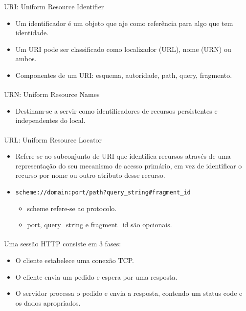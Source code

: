 \documentclass[../resumosLTW.tex]{subfiles}
\begin{document}
 

URI: Uniform Resource Identifier
\begin{itemize}
    \item Um identificador é um objeto que aje como referência para algo que tem identidade.
    \item Um URI pode ser classificado como localizador (URL), nome (URN) ou ambos.
    \item Componentes de um URI: esquema, autoridade, path, query, fragmento.
\end{itemize}

\paragraph{}

URN: Uniform Resource Names
\begin{itemize}
    \item Destinam-se a servir como identificadores de recursos persistentes e independentes do local.
\end{itemize}

\paragraph{}

URL: Uniform Resource Locator
\begin{itemize}
    \item Refere-se ao subconjunto de URI que identifica recursos através de uma representação do seu mecanismo de acesso primário, em vez de identificar o recurso por nome ou outro atributo desse recurso.
    \item \lstinline{scheme://domain:port/path?query_string#fragment_id}
    \begin{itemize}
        \item scheme refere-se ao protocolo.
        \item port, query\_string e fragment\_id são opcionais. 
    \end{itemize}
\end{itemize}

\paragraph{}

Uma sessão HTTP consiste em 3 fases:
\begin{itemize}
    \item O cliente estabelece uma conexão TCP.
    \item O cliente envia um pedido e espera por uma resposta.
    \item O servidor processa o pedido e envia a resposta, contendo um status code e os dados apropriados.
\end{itemize}
\end{document}
